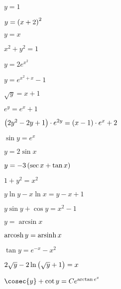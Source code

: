 	\label{sol:firstorder:separable_cauchy}
	\begin{enumsols}
		\item \( y = 1 \) %
		\item \( y = \left( x + 2 \right)^2 \) %
		\item \( y = x \) %
		\item \( x^2 + y^2 = 1 \) %
		\item \( y = 2e^{x^2} \) %
		\item \( y = e^{x^2 + x} - 1 \) %
		\item \( \sqrt{y} = x + 1 \) %
		\item \( e^{y} = e^{x} + 1 \) %
		\item \( \left( 2y^2 - 2y + 1 \right) \cdot e^{2y} = \left( x - 1 \right) \cdot e^{x} + 2 \) %
		\item \( \sin{y} = e^{x} \) %
		\item \( y = 2\sin{x} \) %
		\item \( y = -3 \left( \sec{x} + \tan{x} \right) \) %
		\item \( 1 + y^2 = x^2 \) %
		\item \( y \ln{y} - x \ln{x} = y - x + 1 \) %
		\item \( y \sin{y} + \cos{y} = x^2 - 1 \) %
		\item \( y = \arcsin{x} \) %
		\item \( \operatorname{arcosh}{y} = \operatorname{arsinh}{x} \) %
		\item \( \tan{y} = e^{-x} - x^2 \) %
		\item \( 2\sqrt{y} - 2 \ln\left( \sqrt{y} + 1 \right) = x \) %
		\item \( \cosec{y} + \cot{y} = Ce^{\arctan{e^x}} \) %
	\end{enumsols}
